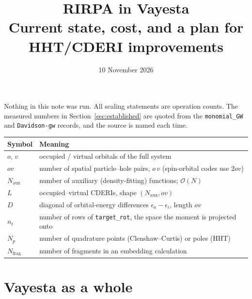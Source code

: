 \documentclass[11pt,a4paper]{article}
\title{RIRPA in Vayesta\\[2pt]
\large Current state, cost, and a plan for HHT/CDERI improvements}
\author{}
\date{10 November 2026}
\newcommand{\code}[1]{\texttt{\small #1}}
\newcommand{\Naux}{N_{\mathrm{aux}}}
\newcommand{\nt}{n_{t}}
\newcommand{\Np}{N_{p}}
\newcommand{\Nfrag}{N_{\mathrm{frag}}}
\newcommand{\ov}{ov}
\begin{document}
\maketitle

\noindent
Nothing in this note was run. All scaling statements are operation counts. The measured
numbers in Section~\ref{sec:established} are quoted from the \code{monomial\_GW} and
\code{Davidson-gw} records, and the source is named each time.

\begin{table}[h]
\centering
\begin{tabularx}{0.9\textwidth}{@{}lL@{}}
\toprule
Symbol & Meaning \\
\midrule
$o$, $v$ & occupied / virtual orbitals of the full system \\
$\ov$ & number of spatial particle--hole pairs, $o\,v$ (spin-orbital codes use $2\ov$) \\
$\Naux$ & number of auxiliary (density-fitting) functions; $\mathcal{O}(N)$ \\
$L$ & occupied--virtual CDERIs, shape $(\Naux, \ov)$ \\
$D$ & diagonal of orbital-energy differences $\epsilon_a-\epsilon_i$, length $\ov$ \\
$\nt$ & number of rows of \code{target\_rot}, the space the moment is projected onto \\
$\Np$ & number of quadrature points (Clenshaw--Curtis) or poles (HHT) \\
$\Nfrag$ & number of fragments in an embedding calculation \\
\bottomrule
\end{tabularx}
\end{table}

\section{Vayesta as a whole}
\end{document}
